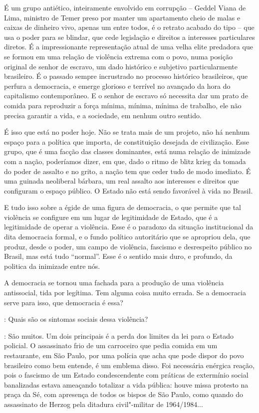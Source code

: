 É um grupo antiético, inteiramente envolvido em corrupção -- Geddel
Viana de Lima, ministro de Temer preso por manter um apartamento cheio
de malas e caixas de dinheiro vivo, apenas um entre todos, é o retrato
acabado do tipo -- que usa o poder para se blindar, que cede legislação
e direitos a interesses particulares diretos. É a impressionante
representação atual de uma velha elite predadora que se formou em uma
relação de violência extrema com o povo, numa posição original de senhor
de escravo, um dado histórico e subjetivo particularmente brasileiro. É
o passado sempre incrustrado no processo histórico brasileiros, que
perfura a democracia, e emerge glorioso e terrível no avançado da hora
do capitalismo contemporâneo. E o senhor de escravo só necessita dar um
prato de comida para reproduzir a força mínima, mínima, mínima de
trabalho, ele não precisa garantir a vida, e a sociedade, em nenhum
outro sentido.

É isso que está no poder hoje. Não se trata mais de um projeto, não há
nenhum espaço para a política que importa, de constituição desejada de
civilização. Esse grupo, que é uma facção das classes dominantes, está
numa relação de inimizade com a nação, poderíamos dizer, em que, dado o
ritmo de blitz krieg da tomada do poder de assalto e no grito, a nação
tem que ceder tudo de modo imediato. É uma guinada neoliberal bárbara,
um real assalto aos interesses e direitos que configuram o espaço
público. O Estado não está sendo favorável à vida no Brasil.

E tudo isso sobre a égide de uma figura de democracia, o que permite que
tal violência se configure em um lugar de legitimidade de Estado, que é
a legitimidade de operar a violência. Esse é o paradoxo da situação
institucional da dita democracia formal, e o fundo político autoritário
que se apropriou dela, que produz, desde o poder, um campo de violência,
fascismo e desrespeito público no Brasil, mas está tudo ``normal''. Esse
é o sentido mais duro, e profundo, da politica da inimizade entre nós.

A democracia se tornou uma fachada para a produção de uma violência
antissocial, tida por legítima. Tem alguma coisa muito errada. Se a
democracia serve para isso, que democracia é essa?

\medskip

\noindent{}: Quais são os sintomas sociais dessa violência?

\medskip

\noindent{}: São muitos. Um dois principais é a perda dos limites da lei para o
Estado policial. O assassinato frio de um carroceiro que pedia comida em
um restaurante, em São Paulo, por uma polícia que acha que pode dispor
do povo brasileiro como bem entende, é um emblema disso. Foi necessária
enérgica reação, pois o fascismo de um Estado condescendente com
práticas de extermínio social banalizadas estava ameaçando totalizar a
vida pública: houve missa protesto na praça da Sé, com apresença de
todos os bispos de São Paulo, como quando do assassinato de Herzog pela
ditadura civil"-militar de 1964/1984...

